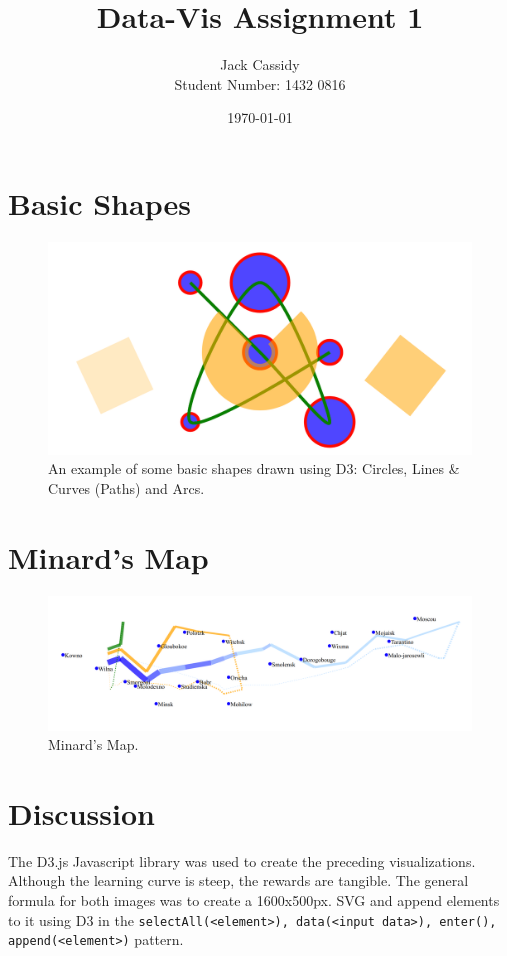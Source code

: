 \documentclass[12pt]{article}
\begin{document}
\title{Data-Vis Assignment 1}
\author{Jack Cassidy \\ Student Number: 1432 0816}
\date{\today}
\maketitle
\section{Basic Shapes}
\begin{figure}[h]
	\centering
	\includegraphics[scale=0.25]{./res/basicshapes}
	\caption{An example of some basic shapes drawn using D3: Circles, Lines \& Curves (Paths) and Arcs.}
	\label{fig:basicshapes}
\end{figure}
\newpage

\section{Minard's Map}
\begin{figure}[h]
	\includegraphics[scale=0.23]{./res/minard}
	\caption{Minard's Map.}
	\label{fig:minard}
\end{figure}

\section{Discussion}
The D3.js Javascript library was used to create the preceding visualizations. Although the learning curve is steep, the rewards are tangible. The general formula for both
images was to create a 1600x500px. SVG and append elements to it using D3 in the \texttt{selectAll(\textless element\textgreater), data(\textless input data\textgreater),
enter(), append(\textless element\textgreater)} pattern.  
\end{document}
